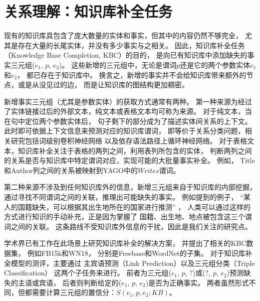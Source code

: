 
\section{关系理解：知识库补全任务}
\label{sec:rw-kbc}


现有的知识库具包含了庞大数量的实体和事实，但其中的内容仍然不够完全，
尤其是存在大量的长尾实体，并没有多少事实与之相关。
因此，知识库补全任务（Knowledge Base Completion, KBC）的目的，
是向已有知识库中添加缺失的事实三元组($e_1$, $p$, $e_2$)。
这些新增的三元组中，无论是谓词$p$还是它的两个参数实体$e_1$和$e_2$，
都已存在于知识库中。
换言之，新增的事实并不会给知识库带来额外的节点，或是从没见过的边，
而是让知识库的图结构更加稠密。

新增事实三元组（尤其是参数实体）的获取方式通常有两种。
第一种来源为经过了实体链接过后的外部文本，纯文本或表格文本均可称为来源。
%
对于纯文本，当在句中定位两个参数实体后，
句子剩下的部分成为了描述实体间关系的上下文。
此时即可依据上下文信息来预测对应的知识库谓词，
即等价于关系分类问题，相关研究包括词级别卷积神经网络\cite{xu2015semantic}
以及依存语法路径上循环神经网络\cite{xu2015classifying}。
对于表格文本，知识库补全关注于表格的两列之间，利用表列所包含的实体，
判断两列之间的关系是否与知识库中特定谓词对应，实现可能的大批量事实补全。
例如，
Title和Author列之间的关系被映射到YAGO中的$Writes$谓词。

第二种来源不涉及到任何知识库外的信息，新增三元组来自于知识库的内部挖掘，
通过寻找不同谓词之间的关联，推理出可能缺失的事实。
例如提到的例子，
``{某人的国籍缺失，可以根据其出生地所在的国家进行推测}'' ，
人类可以通过这样的方式进行知识的手动补充，正是因为掌握了
国籍、出生地、地点被包含这三个谓词之间的关联。
这条路线不受知识库外信息的干扰，因此是我们关注的研究点。

学术界已有工作在此场景上研究知识库补全的解决方案，
并提出了相关的KBC数据集，
例如FB15k\cite{bordes2013translating}和WN18\cite{bordes2014semantic}，
分别是Freebase和WordNet的子集。
对于知识库补全模型的测评，主要通过
主宾语预测（Link Prediction）以及三元组分类（Triple Classification）
这两个子任务来进行。
前者为三元组($e_1$, $p$, $?$)或($?$, $p$, $e_2$)预测缺失的主语或宾语，
后者则判断给定的($e_1$, $p$, $e_2$)是否为正确事实。
两者虽然形式不同，但都需要计算三元组的置信分：$S(e_1, p, e_2; KB)$。

